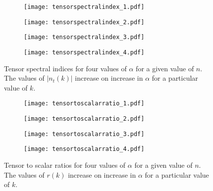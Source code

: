 \documentclass[a4paper,11pt]{article}
\begin{document}
\begin{figure}[H]
\begin{subfigure}{0.52\linewidth}
  \centering
   \texttt{[image: tensorspectralindex\_1.pdf]} 
   \subcaption{}
   \label{fig:tensorSpectralIndex_1}
\end{subfigure}%
\begin{subfigure}{0.52\linewidth}
  \centering
   \texttt{[image: tensorspectralindex\_2.pdf]}
   \subcaption{}
   \label{fig:tensorSpectralIndex_2}
\end{subfigure}%
\vspace{0.1\linewidth}
\begin{subfigure}{0.52\linewidth}
  \centering
   \texttt{[image: tensorspectralindex\_3.pdf]}
   \subcaption{}
    \label{fig:tensorSpectralIndex_3}
\end{subfigure}%
\begin{subfigure}{0.52\linewidth}
  \centering
   \texttt{[image: tensorspectralindex\_4.pdf]}
   \subcaption{}
    \label{fig:tensorSpectralIndex_4}
\end{subfigure}
\caption{Tensor spectral indices for four values of $\alpha$ for a given value of $n$. The values of $|n_t(k)|$ increase on increase in $\alpha$ for a particular value of $k$.}
\label{fig:tensorSpectralIndex}
\end{figure}
\begin{figure}[H]
\begin{subfigure}{0.52\linewidth}
  \centering
   \texttt{[image: tensortoscalarratio\_1.pdf]} 
   \subcaption{}
   \label{fig:tensorToScalarRatio_1}
\end{subfigure}%
\begin{subfigure}{0.52\linewidth}
  \centering
   \texttt{[image: tensortoscalarratio\_2.pdf]}
   \subcaption{}
   \label{fig:tensorToScalarRatio_2}
\end{subfigure}%
\vspace{0.1\linewidth}
\begin{subfigure}{0.52\linewidth}
  \centering
   \texttt{[image: tensortoscalarratio\_3.pdf]}
   \subcaption{}
    \label{fig:tensorToScalarRatio_3}
\end{subfigure}%
\begin{subfigure}{0.52\linewidth}
  \centering
   \texttt{[image: tensortoscalarratio\_4.pdf]}
   \subcaption{}
    \label{fig:tensorToScalarRatio_4}
\end{subfigure}
\caption{Tensor to scalar ratios for four values of $\alpha$ for a given value of $n$. The values of $r(k)$ increase on increase in $\alpha$ for a particular value of $k$.}
\label{fig:tensorToScalarRatio}
\end{figure}
\end{document}

